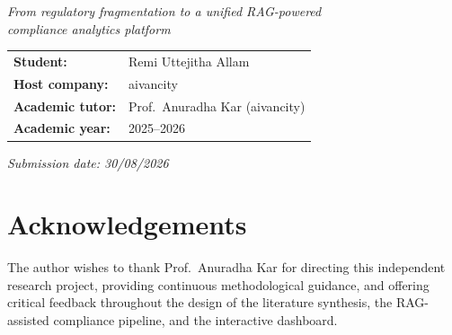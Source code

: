 \documentclass[12pt,a4paper,oneside]{report}
\begin{document}
\begin{titlepage}
\vspace{0.45cm}

{\fontsize{12}{15}\selectfont\itshape\color{aivGold}
From regulatory fragmentation to a unified RAG-powered\\
compliance analytics platform\par}

\vspace{1.1cm}

\noindent
\colorbox{aivBox}{%
\begin{minipage}{0.92\textwidth}
\vspace{0.55em}
\renewcommand{\arraystretch}{1.65}
{\fontsize{11}{14}\selectfont\color{aivNavy}
\begin{tabular}{@{}>{\bfseries}l@{~~}l@{}}
Student: & Remi Uttejitha Allam \\
Host company: & aivancity \\
Academic tutor: & Prof.\ Anuradha Kar (aivancity) \\
Academic year: & 2025--2026 \\
\end{tabular}
\par}
\vspace{0.45em}
\end{minipage}%
}

\vfill

{\fontsize{10}{12}\selectfont\itshape\color{black!45}
Submission date: 30/08/2026\par}

\vspace{0.6cm}

\end{titlepage}
\clearpage

\pagestyle{frontmatter}

\chapter*{Acknowledgements}

The author wishes to thank Prof.\ Anuradha Kar for directing this independent research project, providing continuous methodological guidance, and offering critical feedback throughout the design of the literature synthesis, the RAG-assisted compliance pipeline, and the interactive dashboard.
\end{document}
